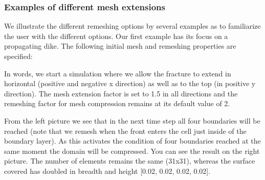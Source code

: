 \documentclass[letterpaper,10pt,english]{sphinxmanual}
\begin{document}
\subsubsection{Examples of different mesh extensions}
\label{\detokenize{RunningASimulation:examples-of-different-mesh-extensions}}
\sphinxAtStartPar
We illustrate the different re\sphinxhyphen{}meshing options by several examples as to familiarize the user with the different
options. Our first example has its focus on a propagating dike. The following initial mesh and re\sphinxhyphen{}meshing properties
are specified:

\begin{sphinxVerbatim}[commandchars=\\\{\}]
   
   

     

\PYG{p}{[} \PYG{p}{]}
\end{sphinxVerbatim}

\sphinxAtStartPar
In words, we start a simulation where we allow the fracture to extend in horizontal (positive and negative x direction)
as well as to the top (in positive y direction). The mesh extension factor is set to 1.5 in all directions and the
re\sphinxhyphen{}meshing factor for mesh compression remains at its default value of 2.

\noindent{}

\noindent{}

\sphinxAtStartPar
From the left picture we see that in the next time step all four boundaries will be reached (note that we re\sphinxhyphen{}mesh when
the front enters the cell just inside of the boundary layer). As this activates the condition of four boundaries reached
at the same moment the domain will be compressed. You can see the result on the right picture. The number of elements
remains the same (31x31), whereas the surface covered has doubled in breadth and height {[}\sphinxhyphen{}0.02, 0.02, \sphinxhyphen{}0.02, 0.02{]}.
\end{document}
